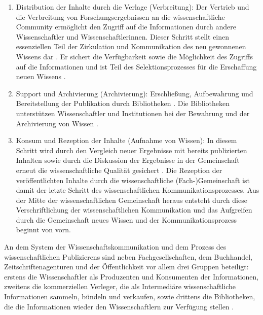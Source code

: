 \begin{enumerate}
\item Distribution der Inhalte durch die Verlage (Verbreitung): Der Vertrieb und die Verbreitung von Forschungsergebnissen an die wissenschaftliche Community ermöglicht den Zugriff auf die Informationen durch andere Wissenschaftler und Wissenschaftlerinnen. Dieser Schritt stellt einen essenziellen Teil der Zirkulation und Kommunikation des neu gewonnenen Wissens dar \cite{cite:11i}. Er sichert die Verfügbarkeit sowie die Möglichkeit des Zugriffs auf die Informationen und ist Teil des Selektionsprozesses für die Erschaffung neuen Wissens \cite{cite:11l}.
\item Support und Archivierung (Archivierung): Erschließung, Aufbewahrung und Bereitstellung der Publikation durch Bibliotheken \cite{schirmbacher_2009_wisspub}. Die Bibliotheken unterstützen Wissenschaftler und Institutionen bei der Bewahrung und der Archivierung von Wissen \cite{K_lbel_2002}.
\item Konsum und Rezeption der Inhalte (Aufnahme von Wissen): In diesem Schritt wird durch den Vergleich neuer Ergebnisse mit bereits publizierten Inhalten sowie durch die Diskussion der Ergebnisse in der Gemeinschaft erneut die wissenschaftliche Qualität gesichert \cite{umstatter_2007_qualitatssicherung}. Die Rezeption der veröffentlichten Inhalte durch die wissenschaftliche (Fach-)Gemeinschaft ist damit der letzte Schritt des wissenschaftlichen Kommunikationsprozesses. Aus der Mitte der wissenschaftlichen Gemeinschaft heraus entsteht durch diese Verschriftlichung der wissenschaftlichen Kommunikation und das Aufgreifen durch die Gemeinschaft neues Wissen \cite{cite:11k} \cite{schirmbacher_2009_wisspub} und der Kommunikationsprozess beginnt von vorn.
\end{enumerate}

An dem System der Wissenschaftskommunikation und dem Prozess des wissenschaftlichen Publizierens sind neben Fachgesellschaften, dem Buchhandel, Zeitschriftenagenturen und der Öffentlichkeit \cite[:6]{seidenfaden_2005_kommunikation} vor allem drei Gruppen beteiligt: erstens die Wissenschaftler als Produzenten und Konsumenten der Informationen, zweitens die kommerziellen Verleger, die als Intermediäre wissenschaftliche Informationen sammeln, bündeln und verkaufen, sowie drittens die Bibliotheken, die die Informationen wieder den Wissenschaftlern zur Verfügung stellen \cite{Odlyzko_1997}.

